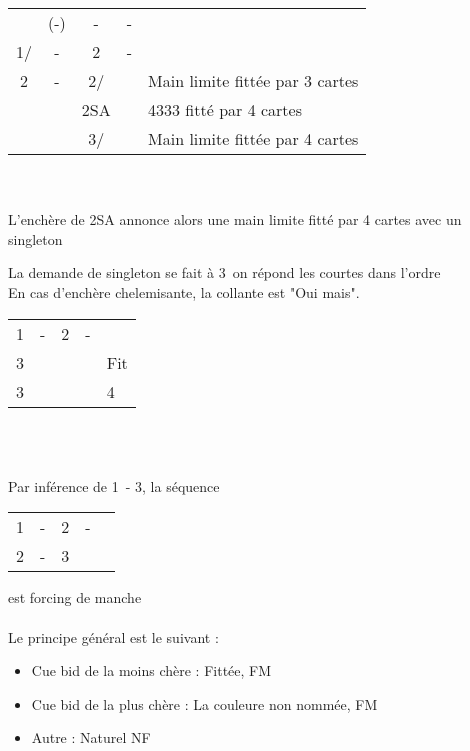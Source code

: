 \documentclass[a4paper, oneside, 11pt]{report}
\begin{document}
		\begin{tabular}{cccc|l}
		& (-) & - & - &\\
		1\coeur/\pique & - & 2\trefle & - &\\
		2\carreau & - & 2\coeur/\pique && Main limite fittée par 3 cartes\\
		&& 2SA && 4333 fitté par 4 cartes\\
		&& 3\coeur/\pique && Main limite fittée par 4 cartes\\
		\end{tabular}\\\\
		
		L'enchère de 2SA annonce alors une main limite fitté par 4 cartes avec un singleton
		
		La demande de singleton se fait à 3\trefle\ on répond les courtes dans l'ordre\\

		En cas d'enchère chelemisante, la collante est "Oui mais".\\

		\begin{tabular}{cccc|l}
		1\pique & - & 2\carreau & - &\\
		3\trefle &&&& Fit \carreau \\
		3\carreau &&&& 4\trefle \\
		\end{tabular}\\\\

	
		Par inférence de 1\pique\ - 3\coeur, la séquence 		
		\begin{tabular}{cccc|l}
		1\pique & - & 2\coeur & - &\\
		2\pique & - & 3\coeur && \\
		\end{tabular}
		est forcing de manche\\\\
		
		Le principe général est le suivant :
		\begin{itemize}
		\item Cue bid de la moins chère : Fittée, FM
		\item Cue bid de la plus chère : La couleure non nommée, FM
		\item Autre : Naturel NF\\
		\end{itemize}
		
\end{document}
